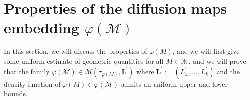 \section{Properties of the diffusion maps embedding \texorpdfstring{$\varphi(\mathcal{M})$}{phi(M)}}
\label{phiM}

In this section, we will discuss the properties of $\varphi(M)$, and
we will first give some uniform estimate of geometric quantities for
all $M \in \mathcal{M}$, and we will prove that the family
$\varphi(\mathcal{M}) \in \mathcal{M}(\tau_{\varphi(M)},\textbf{L}^\prime)$
where $\textbf{L}^\prime:=\left(L_\perp^\prime,\dots,L_k^\prime\right)$ and the
density function of $\varphi(M)\in  \varphi(\mathcal{M})$ admits an
uniform upper and lower bounds.




 
























